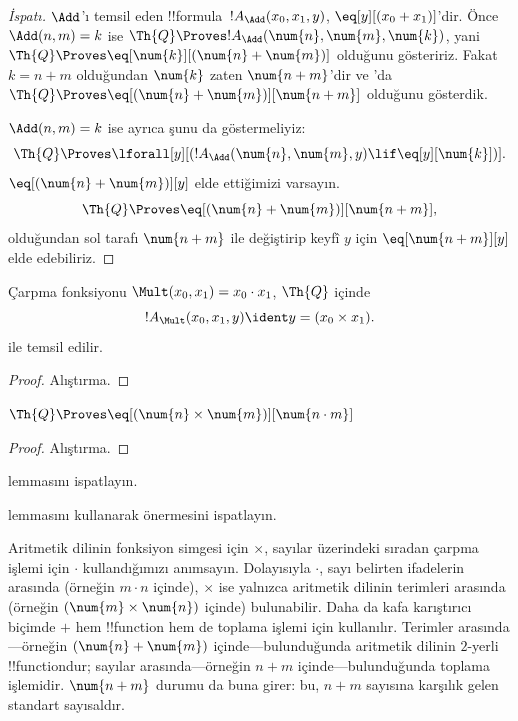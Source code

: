 \begin{proof}[ İspatı]
$\Add$'ı temsil eden !!{formula}~$!A_\Add(x_0,x_1,y)$,
$\eq[y][(x_0+x_1)]$'dir. Önce $\Add(n,m)=k$ ise
$\Th{Q} \Proves !A_\Add(\num{n},\num{m},\num{k})$, yani
$\Th{Q} \Proves \eq[\num{k}][(\num{n}+\num{m})]$ olduğunu gösteririz.
Fakat $k=n+m$ olduğundan $\num{k}$ zaten $\num{n+m}$'dir ve
'da
$\Th{Q} \Proves \eq[(\num{n}+\num{m})][\num{n+m}]$ olduğunu gösterdik.

$\Add(n,m)=k$ ise ayrıca şunu da göstermeliyiz:
\[
\Th{Q} \Proves \lforall[y][(!A_\Add(\num{n}, \num{m}, y) \lif
  \eq[y][\num{k}])].
\]
$\eq[(\num{n}+\num{m})][y]$ elde ettiğimizi varsayın.
\[
\Th{Q} \Proves \eq[(\num{n}+\num{m})][\num{n+m}],
\]
olduğundan sol tarafı $\num{n+m}$ ile değiştirip keyfî $y$ için
$\eq[\num{n+m}][y]$ elde edebiliriz.
\end{proof}

\begin{prop}
Çarpma fonksiyonu $\Mult(x_0,x_1)=x_0\cdot x_1$, $\Th{Q}$ içinde
\[
  !A_{\Mult}(x_0, x_1, y) \ident y = (x_0 \times x_1).
\]
ile temsil edilir.
\end{prop}

\begin{proof} Alıştırma. \end{proof}

\begin{lem}
$\Th{Q} \Proves \eq[(\num{n} \times \num{m})][\num{n \cdot m}]$
\end{lem}

\begin{proof} Alıştırma. \end{proof}

\begin{prob}
 lemmasını ispatlayın.
\end{prob}

\begin{prob}
 lemmasını kullanarak
 önermesini ispatlayın.
\end{prob}

\begin{explain}
  Aritmetik dilinin fonksiyon simgesi için $\times$, sayılar üzerindeki
  sıradan çarpma işlemi için $\cdot$ kullandığımızı anımsayın. Dolayısıyla
  $\cdot$, sayı belirten ifadelerin arasında (örneğin $m\cdot n$ içinde),
  $\times$ ise yalnızca aritmetik dilinin terimleri arasında (örneğin
  $(\num{m}\times\num{n})$ içinde) bulunabilir. Daha da kafa karıştırıcı
  biçimde $+$ hem !!{function} hem de toplama işlemi için kullanılır.
  Terimler arasında---örneğin $(\num{n}+\num{m})$ içinde---bulunduğunda
  aritmetik dilinin $2$-yerli !!{function}{}dur; sayılar arasında---örneğin
  $n+m$ içinde---bulunduğunda toplama işlemidir. $\num{n+m}$ durumu da
  buna girer: bu, $n+m$ sayısına karşılık gelen standart sayısaldır.
\end{explain}

